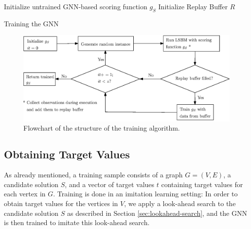 \documentclass[draft,final]{vutinfth} %
\begin{document}
\begin{algorithm}
    \DontPrintSemicolon
    Initialize untrained GNN-based scoring function $g_S$ \; 
    Initialize Replay Buffer $R$ \;
    \caption{Training the GNN}
    \label{alg:training}
\end{algorithm}

\begin{figure}
    \centering
    \includegraphics[width=\textwidth]{graphics/flowchart_training_algorithm.eps}
    \caption{Flowchart of the structure of the training algorithm.}
    \label{fig:flowchart-training-algorithm}
\end{figure}

\subsection{Obtaining Target Values}\label{subsec:target-values}
As already mentioned, a training sample consists of a graph $G = (V,E)$, a candidate solution $S$, and a vector of target values $t$ containing target values for each vertex in $G$. Training is done in an imitation learning setting: In order to obtain target values for the vertices in $V$, we apply a look-ahead search to the candidate solution $S$ as described in Section \ref{sec:lookahead-search}, and the GNN is then trained to imitate this look-ahead search. 
\end{document}
